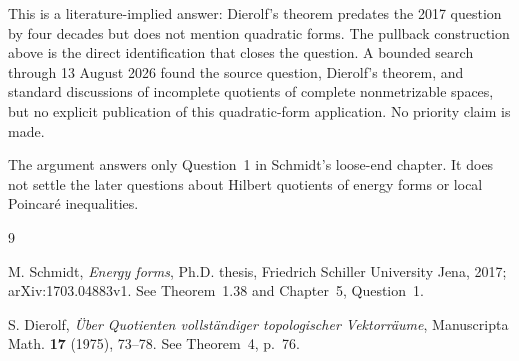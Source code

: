 \documentclass[11pt]{article}
\begin{document}
This is a literature-implied answer: Dierolf's theorem predates the 2017 question by four decades but does not mention quadratic forms. The pullback construction above is the direct identification that closes the question. A bounded search through 13 August 2026 found the source question, Dierolf's theorem, and standard discussions of incomplete quotients of complete nonmetrizable spaces, but no explicit publication of this quadratic-form application. No priority claim is made.

The argument answers only Question~1 in Schmidt's loose-end chapter. It does not settle the later questions about Hilbert quotients of energy forms or local Poincar\'e inequalities.

\begin{sloppypar}
\begin{thebibliography}{9}
\raggedright
{}
M. Schmidt, \emph{Energy forms}, Ph.D. thesis, Friedrich Schiller University Jena, 2017; arXiv:1703.04883v1. See Theorem~1.38 and Chapter~5, Question~1.

S. Dierolf, \emph{\"Uber Quotienten vollst\"andiger topologischer Vektorr\"aume}, Manuscripta Math. \textbf{17} (1975), 73--78. See Theorem~4, p.~76.
\end{thebibliography}
\end{sloppypar}
\end{document}
